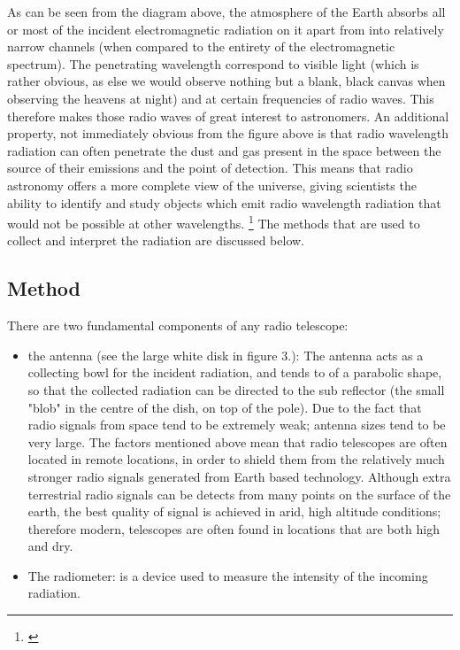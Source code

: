 \documentclass{article}
\begin{document}
As can be seen from the diagram above, the atmosphere of the Earth absorbs all or most of the incident electromagnetic radiation on it apart from into relatively narrow channels (when compared to the entirety of the electromagnetic spectrum). The penetrating wavelength correspond to visible light (which is rather obvious, as else we would observe nothing but a blank, black canvas when observing the heavens at night) and at certain frequencies of radio waves. This therefore makes those radio waves of great interest to astronomers. An additional property, not immediately obvious from the figure above is that radio wavelength radiation can often penetrate the dust and gas present in the space between the source of their emissions and the point of detection. This means that radio astronomy offers a more complete view of the universe, giving scientists the ability to identify and study objects which emit radio wavelength radiation that would not be possible at other wavelengths. \footnote{\cite{radiobook, eradio, fradio}} The methods that are used to collect and interpret the radiation are discussed below.


\subsection{Method}

There are two fundamental components of any radio telescope: 

\begin{itemize}

    \item the antenna (see the large white disk in figure 3.): The antenna acts as a collecting bowl for the incident radiation, and tends to of a parabolic shape, so that the collected radiation can be directed to the sub reflector (the small "blob" in the centre of the dish, on top of the pole). Due to the fact that radio signals from space tend to be extremely weak; antenna sizes tend to be very large. The factors mentioned above mean that radio telescopes are often located in remote locations, in order to shield them from the relatively much stronger radio signals generated from Earth based technology. Although extra terrestrial radio signals can be detects from many points on the surface of the earth, the best quality of signal is achieved in arid, high altitude conditions; therefore modern, telescopes are often found in locations that are both high and dry.
    
    \item The radiometer: is a device used to measure the intensity of the incoming radiation.
    
\end{itemize}
\end{document}
